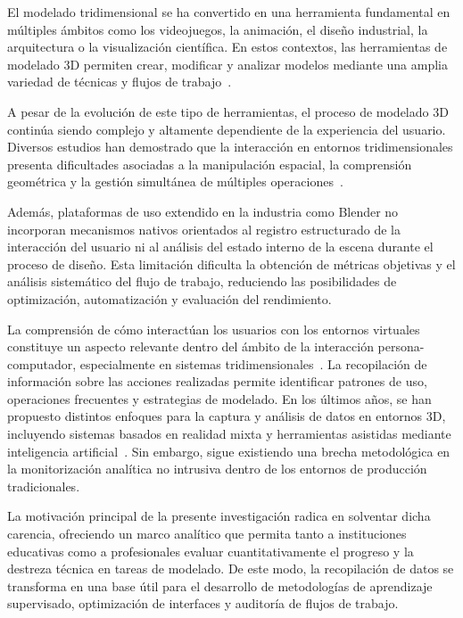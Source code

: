 
El modelado tridimensional se ha convertido en una herramienta fundamental en múltiples ámbitos como los videojuegos, la animación, el diseño industrial, la arquitectura o la visualización científica. En estos contextos, las herramientas de modelado 3D permiten crear, modificar y analizar modelos mediante una amplia variedad de técnicas y flujos de trabajo~\cite{lavioila2017}.

A pesar de la evolución de este tipo de herramientas, el proceso de modelado 3D continúa siendo complejo y altamente dependiente de la experiencia del usuario. Diversos estudios han demostrado que la interacción en entornos tridimensionales presenta dificultades asociadas a la manipulación espacial, la comprensión geométrica y la gestión simultánea de múltiples operaciones~\cite{jankowski2014}.

Además, plataformas de uso extendido en la industria como Blender no incorporan mecanismos nativos orientados al registro estructurado de la interacción del usuario ni al análisis del estado interno de la escena durante el proceso de diseño. Esta limitación dificulta la obtención de métricas objetivas y el análisis sistemático del flujo de trabajo, reduciendo las posibilidades de optimización, automatización y evaluación del rendimiento.

La comprensión de cómo interactúan los usuarios con los entornos virtuales constituye un aspecto relevante dentro del ámbito de la interacción persona-computador, especialmente en sistemas tridimensionales~\cite{lavioila2017}. La recopilación de información sobre las acciones realizadas permite identificar patrones de uso, operaciones frecuentes y estrategias de modelado. En los últimos años, se han propuesto distintos enfoques para la captura y análisis de datos en entornos 3D, incluyendo sistemas basados en realidad mixta y herramientas asistidas mediante inteligencia artificial~\cite{3description2024,malik2023}. Sin embargo, sigue existiendo una brecha metodológica en la monitorización analítica no intrusiva dentro de los entornos de producción tradicionales.

La motivación principal de la presente investigación radica en solventar dicha carencia, ofreciendo un marco analítico que permita tanto a instituciones educativas como a profesionales evaluar cuantitativamente el progreso y la destreza técnica en tareas de modelado. De este modo, la recopilación de datos se transforma en una base útil para el desarrollo de metodologías de aprendizaje supervisado, optimización de interfaces y auditoría de flujos de trabajo.

